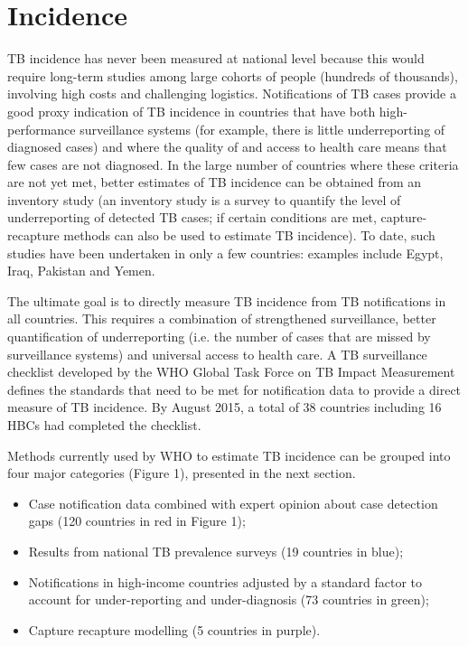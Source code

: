 \section{Incidence}

TB incidence has never been measured at national level because this would require long-term studies among large cohorts of people (hundreds of thousands), involving high costs and challenging logistics. Notifications of TB cases provide a good proxy indication of TB incidence in countries that have both high-performance surveillance systems (for example, there is little underreporting of diagnosed cases) and where the quality of and access to health care means that few cases are not diagnosed. In the large number of countries where these criteria are not yet met, better estimates of TB incidence can be obtained from an inventory study\cite{WHO2012} (an inventory study is a survey to quantify the level of underreporting of detected TB cases; if certain conditions are met, capture-recapture methods can also be used to estimate TB incidence). To date, such studies have been undertaken in only a few countries: examples include Egypt, Iraq, Pakistan and Yemen. 

The ultimate goal is to directly measure TB incidence from TB notifications in all countries. This requires a combination of strengthened surveillance, better quantification of underreporting (i.e. the number of cases that are missed by surveillance systems) and universal access to health care. A TB surveillance checklist developed by the WHO Global Task Force on TB Impact Measurement defines the standards that need to be met for notification data to provide a direct measure of TB incidence. By August 2015, a total of 38 countries including 16 HBCs had completed the checklist. 

Methods currently used by WHO to estimate TB incidence can be grouped into four major categories (Figure 1), presented in the next section. 

\begin{itemize}
\item Case notification data combined with expert opinion about case detection gaps (120 countries in red in Figure 1);
\item Results from national TB prevalence surveys (19 countries in blue);
\item Notifications in high-income countries adjusted by a standard factor to account for under-reporting and under-diagnosis (73 countries in green);
\item Capture recapture modelling (5 countries in purple).
\end{itemize}






  
  
  
  
  
  
  
  
  
  